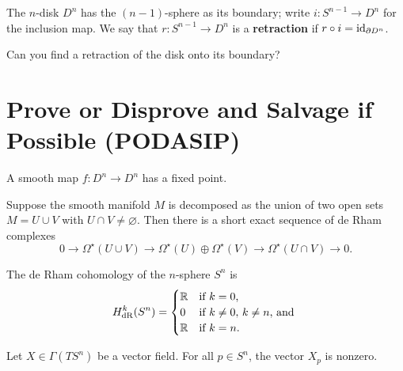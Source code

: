 \documentclass{homework}
\begin{document}
\begin{problem}\label{no-retraction}The $n$-disk $D^n$ has the $(n-1)$-sphere as its
boundary; write $i : S^{n-1} \to D^n$ for the inclusion map.  We say
that $r : S^{n-1} \to D^n$ is a \textbf{retraction} if $r \circ i =
\operatorname{id}_{\partial D^n}$.

Can you find a retraction of the disk onto its boundary?
\end{problem}

\section{Prove or Disprove and Salvage if Possible (PODASIP)}

\begin{problem}
 A smooth map $f : D^n \to D^n$ has a fixed point. 
\end{problem}


\begin{problem}
  Suppose the smooth manifold $M$ is decomposed as the union of two open sets $M = U \cup V$ with $U \cap V \neq \varnothing$.  Then there is a short exact sequence of de Rham complexes
  \[
    0 \longrightarrow \Omega^\star(U \cup V) \longrightarrow \Omega^\star(U) \oplus \Omega^\star(V) \longrightarrow \Omega^\star(U \cap V) \longrightarrow 0.
 \]
\end{problem}

\begin{problem}
  The de Rham cohomology of the $n$-sphere $S^n$ is
  \[
    H_{\operatorname{dR}}^k(S^n) = \begin{cases}
      \mathbb{R} & \mbox{if $k = 0$,} \\
      0 & \mbox{if $k \neq 0, \, k \neq n$, and }\\
      \mathbb{R} & \mbox{if $k = n$.}
      \end{cases}
  \]
\end{problem}

\begin{problem}
  Let $X \in \Gamma(TS^n)$ be a vector field.  For all $p \in S^n$, the vector $X_p$ is nonzero. 
\end{problem}
\end{document}
